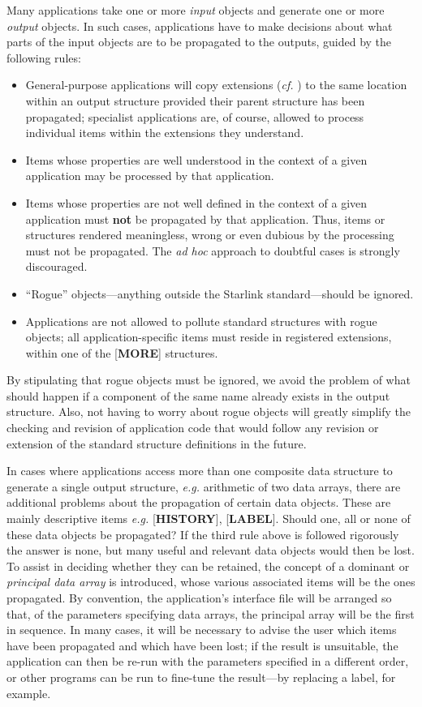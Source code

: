 \documentclass[twoside,11pt,nolof,noabs]{starlink}
\begin{document}
Many applications take one or more \textit{input} objects and
generate one or more \textit{output} objects.  In such cases,
applications have to make
decisions about what parts of the input
objects are to be propagated to the outputs, guided by the
following rules:
\begin{itemize}
\item
General-purpose applications will copy extensions
(\textit{cf.} )
to the same location within an output structure provided their
parent structure has been propagated; specialist applications are,
of course, allowed to process individual items within the extensions
they understand.
\item
Items whose properties are well understood in the context of a given
application may be processed by that application.
\item
Items whose properties are not well defined in the context of a given
application must \textbf{not} be propagated by that application.  Thus, items
or structures rendered meaningless, wrong or even dubious by the
processing must not be propagated.  The \textit{ad hoc} approach to
doubtful cases is strongly discouraged.
\item
``Rogue'' objects---anything outside the Starlink standard---should
be ignored.
\item
Applications are not allowed to pollute standard structures
with rogue objects;  all application-specific items must reside
in registered extensions, within one of the {[}\textbf{MORE}{]}
structures.
\end{itemize}

By stipulating that rogue objects must be ignored, we
avoid the problem of what should happen
if a component of the same name already exists in the output structure.
Also, not having to worry about rogue objects will greatly simplify the
checking and revision of application code that would follow
any revision or extension of the standard structure definitions
in the future.

In cases where applications access more than one composite data structure
to generate a single output structure, \textit{e.g.} arithmetic of two data
arrays, there are additional problems about the propagation of certain
data objects.  These are mainly descriptive items \textit{e.g.}
{[}\textbf{HISTORY}{]}, {[}\textbf{LABEL}{]}.
Should one, all or none of these data objects be propagated?
If the third rule above is followed rigorously the answer is none, but
many useful and relevant data objects would then be lost.  To assist
in deciding whether they can be
retained, the concept of a dominant or \textit{principal data array} is
introduced, whose various associated items will be the ones propagated.
By convention, the application's interface file
will be arranged so that, of the parameters specifying data
arrays, the principal array will be the first in sequence.  In many
cases, it will be necessary to advise the user which items have
been propagated and which have been lost;  if the result is
unsuitable, the application can then be re-run with the
parameters specified in a different order, or other programs can
be run to fine-tune the result---by replacing a label, for example.
\end{document}
